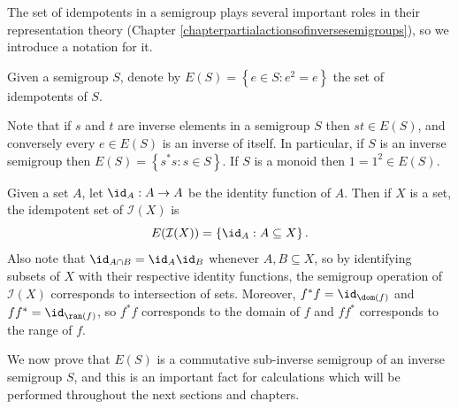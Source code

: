 The set of idempotents in a semigroup plays several important roles in their representation theory (Chapter \ref{chapterpartialactionsofinversesemigroups}), so we introduce a notation for it.

\begin{definition}
Given a semigroup $S$, denote by $E(S)=\left\{e\in S:e^2=e\right\}$ the set of idempotents of $S$.
\end{definition}

Note that if $s$ and $t$ are inverse elements in a semigroup $S$ then $st\in E(S)$, and conversely every $e\in E(S)$ is an inverse of itself. In particular, if $S$ is an inverse semigroup then $E(S)=\left\{s^*s:s\in S\right\}$. If $S$ is a monoid then $1=1^2\in E(S)$.

\begin{example}\label{exampleidempotentssets}
Given a set $A$, let $\id_A:A\to A$ be the identity function of $A$. Then if $X$ is a set, the idempotent set of $\mathcal{I}(X)$ is
\[E(\mathcal{I}(X))=\left\{\id_A:A\subseteq X\right\}.\]
Also note that $\id_{A\cap B}=\id_A\id_B$ whenever $A,B\subseteq X$, so by identifying subsets of $X$ with their respective identity functions, the semigroup operation of $\mathcal{I}(X)$ corresponds to intersection of sets. Moreover, $f^*f=\id_{\dom(f)}$ and $ff^*=\id_{\ran(f)}$, so $f^*f$ corresponds to the domain of $f$ and $ff^*$ corresponds to the range of $f$.
\end{example}

We now prove that $E(S)$ is a commutative sub-inverse semigroup of an inverse semigroup $S$, and this is an important fact for calculations which will be performed throughout the next sections and chapters.

